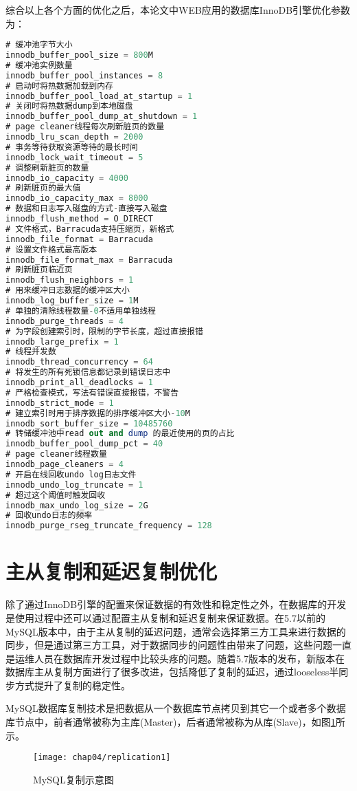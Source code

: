 综合以上各个方面的优化之后，本论文中WEB应用的数据库InnoDB引擎优化参数为：
\begin{lstlisting}[language=sql,numbers=none]
# 缓冲池字节大小
innodb_buffer_pool_size = 800M
# 缓冲池实例数量
innodb_buffer_pool_instances = 8
# 启动时将热数据加载到内存
innodb_buffer_pool_load_at_startup = 1
# 关闭时将热数据dump到本地磁盘
innodb_buffer_pool_dump_at_shutdown = 1
# page cleaner线程每次刷新脏页的数量
innodb_lru_scan_depth = 2000
# 事务等待获取资源等待的最长时间
innodb_lock_wait_timeout = 5
# 调整刷新脏页的数量
innodb_io_capacity = 4000
# 刷新脏页的最大值
innodb_io_capacity_max = 8000
# 数据和日志写入磁盘的方式-直接写入磁盘
innodb_flush_method = O_DIRECT
# 文件格式，Barracuda支持压缩页，新格式
innodb_file_format = Barracuda
# 设置文件格式最高版本
innodb_file_format_max = Barracuda
# 刷新脏页临近页
innodb_flush_neighbors = 1
# 用来缓冲日志数据的缓冲区大小
innodb_log_buffer_size = 1M
# 单独的清除线程数量-0不适用单独线程
innodb_purge_threads = 4
# 为字段创建索引时，限制的字节长度，超过直接报错
innodb_large_prefix = 1
# 线程并发数
innodb_thread_concurrency = 64
# 将发生的所有死锁信息都记录到错误日志中
innodb_print_all_deadlocks = 1
# 严格检查模式，写法有错误直接报错，不警告
innodb_strict_mode = 1
# 建立索引时用于排序数据的排序缓冲区大小-10M
innodb_sort_buffer_size = 10485760
# 转储缓冲池中read out and dump 的最近使用的页的占比
innodb_buffer_pool_dump_pct = 40
# page cleaner线程数量
innodb_page_cleaners = 4
# 开启在线回收undo log日志文件
innodb_undo_log_truncate = 1
# 超过这个阈值时触发回收
innodb_max_undo_log_size = 2G
# 回收undo日志的频率
innodb_purge_rseg_truncate_frequency = 128
\end{lstlisting}

\section{主从复制和延迟复制优化}
除了通过InnoDB引擎的配置来保证数据的有效性和稳定性之外，在数据库的开发是使用过程中还可以通过配置主从复制和延迟复制来保证数据。在5.7以前的MySQL版本中，由于主从复制的延迟问题，通常会选择第三方工具来进行数据的同步，但是通过第三方工具，对于数据同步的问题性由带来了问题，这些问题一直是运维人员在数据库开发过程中比较头疼的问题。随着5.7版本的发布，新版本在数据库主从复制方面进行了很多改进，包括降低了复制的延迟，通过looseless半同步方式提升了复制的稳定性。

MySQL数据库复制技术是把数据从一个数据库节点拷贝到其它一个或者多个数据库节点中，前者通常被称为主库(Master)，后者通常被称为从库(Slave)，如图\ref{fig:replication1}所示。
\begin{figure}[H] %
  \centering
  \texttt{[image: chap04/replication1]}
  \caption{MySQL复制示意图}
  \label{fig:replication1}
\end{figure}

